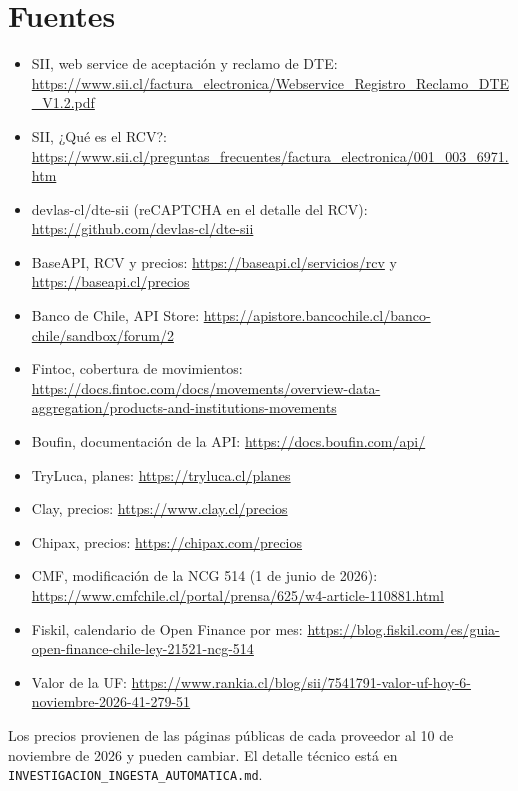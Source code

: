 \documentclass[11pt,a4paper]{article}
\begin{document}
\section*{Fuentes}
\footnotesize
\begin{itemize}[itemsep=0.1em]
  \item SII, web service de aceptación y reclamo de DTE: \url{https://www.sii.cl/factura_electronica/Webservice_Registro_Reclamo_DTE_V1.2.pdf}
  \item SII, ¿Qué es el RCV?: \url{https://www.sii.cl/preguntas_frecuentes/factura_electronica/001_003_6971.htm}
  \item devlas-cl/dte-sii (reCAPTCHA en el detalle del RCV): \url{https://github.com/devlas-cl/dte-sii}
  \item BaseAPI, RCV y precios: \url{https://baseapi.cl/servicios/rcv} y \url{https://baseapi.cl/precios}
  \item Banco de Chile, API Store: \url{https://apistore.bancochile.cl/banco-chile/sandbox/forum/2}
  \item Fintoc, cobertura de movimientos: \url{https://docs.fintoc.com/docs/movements/overview-data-aggregation/products-and-institutions-movements}
  \item Boufin, documentación de la API: \url{https://docs.boufin.com/api/}
  \item TryLuca, planes: \url{https://tryluca.cl/planes}
  \item Clay, precios: \url{https://www.clay.cl/precios}
  \item Chipax, precios: \url{https://chipax.com/precios}
  \item CMF, modificación de la NCG 514 (1 de junio de 2026): \url{https://www.cmfchile.cl/portal/prensa/625/w4-article-110881.html}
  \item Fiskil, calendario de Open Finance por mes: \url{https://blog.fiskil.com/es/guia-open-finance-chile-ley-21521-ncg-514}
  \item Valor de la UF: \url{https://www.rankia.cl/blog/sii/7541791-valor-uf-hoy-6-noviembre-2026-41-279-51}
\end{itemize}
\vspace{0.3em}
{\color{gris}Los precios provienen de las páginas públicas de cada proveedor al 10 de noviembre de 2026 y pueden cambiar. El detalle técnico está en \texttt{INVESTIGACION\_INGESTA\_AUTOMATICA.md}.}
\end{document}
